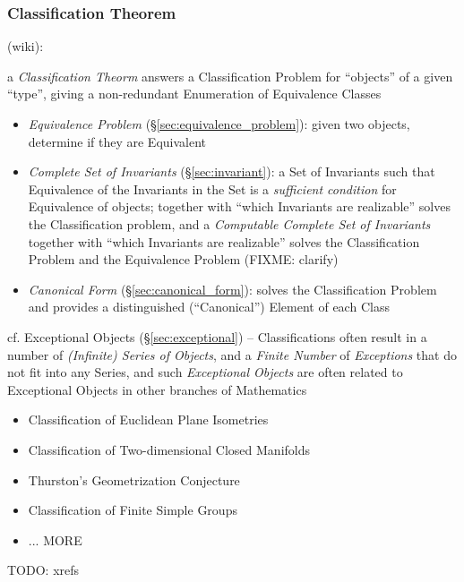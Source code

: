 \subsubsection{Classification Theorem}\label{sec:classification_theorem}

(wiki):

a \emph{Classification Theorm} answers a Classification Problem for ``objects''
of a given ``type'', giving a non-redundant Enumeration of Equivalence Classes

\begin{itemize}
  \item \emph{Equivalence Problem} (\S\ref{sec:equivalence_problem}): given two
    objects, determine if they are Equivalent
  \item \emph{Complete Set of Invariants} (\S\ref{sec:invariant}): a Set of
    Invariants such that Equivalence of the Invariants in the Set is a
    \emph{sufficient condition} for Equivalence of objects; together with
    ``which Invariants are realizable'' solves the Classification problem, and a
    \emph{Computable Complete Set of Invariants} together with ``which
    Invariants are realizable'' solves the Classification Problem and the
    Equivalence Problem (FIXME: clarify)
  \item \emph{Canonical Form} (\S\ref{sec:canonical_form}): solves the
    Classification Problem and provides a distinguished (``Canonical'') Element
    of each Class
\end{itemize}

cf. Exceptional Objects (\S\ref{sec:exceptional}) -- Classifications often
result in a number of \emph{(Infinite) Series of Objects}, and a \emph{Finite
  Number} of \emph{Exceptions} that do not fit into any Series, and such
\emph{Exceptional Objects} are often related to Exceptional Objects in other
branches of Mathematics

\begin{itemize}
  \item Classification of Euclidean Plane Isometries
  \item Classification of Two-dimensional Closed Manifolds
  \item Thurston's Geometrization Conjecture
  \item Classification of Finite Simple Groups
  \item ... MORE
\end{itemize}

TODO: xrefs



